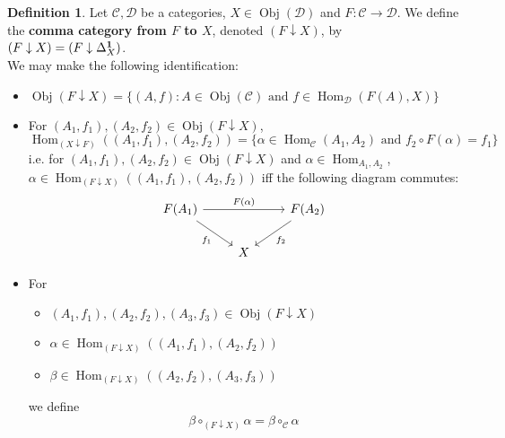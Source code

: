 \documentclass[12pt]{amsart}
\theoremstyle{definition}
\newtheorem{defn}[definition]{Definition}
\newcommand{\al}{\alpha}
\newcommand{\be}{\beta}
\newcommand{\Del}{\Delta}
\newcommand{\MC}{\mathcal{C}}
\newcommand{\MD}{\mathcal{D}}
\DeclareMathOperator{\Obj}{Obj}
\DeclareMathOperator{\Hom}{Hom}
\DeclareMathOperator*{\0}{\mbf{0}}
\DeclareMathOperator*{\1}{\mbf{1}}
\begin{document}
	\begin{defn}
		Let $\MC, \MD$ be a categories, $X \in \Obj(\MD)$ and $F: \MC \rightarrow \MD$. We define the \textbf{comma category from $F$ to $X$}, denoted $(F \downarrow X)$, by $(F \downarrow X) = (F \downarrow \Del^{\1}_X)$.\\
		We may make the following identification:
		\begin{itemize}
			\item $\Obj(F \downarrow X) = \{(A, f): A \in \Obj(\MC) \text{ and } f \in \Hom_{\MD}(F(A), X)\}$ 
			\item For $(A_1, f_1), (A_2, f_2) \in \Obj(F \downarrow X)$, 
			$$\Hom_{(X \downarrow F)}((A_1, f_1), (A_2, f_2)) = \{\al \in \Hom_{\MC}(A_1, A_2) \text{ and } f_2 \circ F(\al)  = f_1\}$$
			i.e. for $(A_1, f_1), (A_2, f_2) \in \Obj(F \downarrow X)$ and $\al \in \Hom_{A_1, A_2}$, $\al \in \Hom_{(F \downarrow X)}((A_1, f_1), (A_2, f_2))$ iff the following diagram commutes:
			\[ 
			\begin{tikzcd}
				F(A_1) \arrow[dr, "f_1"'] \arrow[rr, "F(\al)"] &&  F(A_2) \arrow[dl, "f_2"]\\
				& X  & 
			\end{tikzcd}
			\]
			\item For 
			\begin{itemize}
				\item $(A_1, f_1), (A_2, f_2), (A_3, f_3) \in \Obj(F \downarrow X)$
				\item $\al \in \Hom_{(F \downarrow X)}((A_1, f_1), (A_2, f_2))$
				\item $\be \in \Hom_{(F \downarrow X)}((A_2, f_2), (A_3, f_3))$
			\end{itemize}
			we define 
			$$\be \circ_{(F \downarrow X)} \al = \be \circ_{\MC} \al $$
		\end{itemize}
	\end{defn}
	
	
	
	
	
	
	
	
	
	
	
	
	
	
	
	
	
	
	
	
	
	
	
	
	
	
	
	
	
	
	
\end{document}
